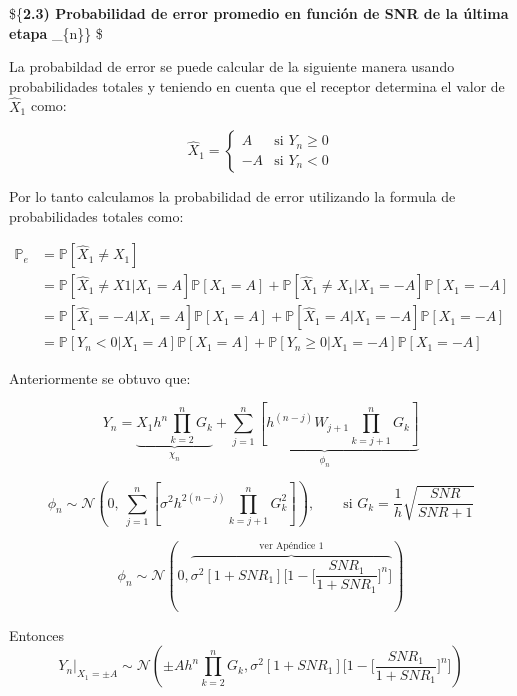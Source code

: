 \documentclass[11pt]{article}
\begin{document}
    \$\{\quad \quad \Large\textbf{2.3) Probabilidad de error promedio en función de SNR de la última etapa }
\rho\_\{n\}\} \$

La probabildad de error se puede calcular de la siguiente manera usando
probabilidades totales y teniendo en cuenta que el receptor determina el
valor de \(\hat{X}_1\) como:

\[
\hat{X}_{1} = \left\{\begin{array}{ll}
         A & \textrm{si } Y_{n} \geq 0\\
        -A & \textrm{si } Y_{n} < 0
      \end{array}\right.
\]

Por lo tanto calculamos la probabilidad de error utilizando la formula
de probabilidades totales como:

\[
\begin{aligned}
\mathbb{P}_{e} &= \mathbb{P}\left[\hat{X}_{1} \neq X_{1}\right]\\ 
&= \mathbb{P}\left[\hat{X}_{1} \neq X{1} |{X_{1} = A}\right]\mathbb{P}\left[X_{1} = A\right] + \mathbb{P}\left[\hat{X}_{1} \neq X_{1} |{X_{1} = -A}\right] \mathbb{P}\left[X_{1} = -A\right]\\
&= \mathbb{P}\left[\hat{X}_{1} = -A |{X_{1} = A}\right] \mathbb{P}\left[X_{1} = A\right] + \mathbb{P}\left[\hat{X}_{1} = A |{X_{1} = -A}\right] \mathbb{P}\left[X_{1} = -A\right]\\
&= \mathbb{P}\left[Y_{n} < 0 |{X_{1} = A}\right] \mathbb{P}\left[X_{1} = A\right] + \mathbb{P}\left[Y_{n} \geq 0 |{X_{1} = -A}\right] \mathbb{P}\left[X_{1} = -A\right]
\end{aligned}
\]

Anteriormente se obtuvo que:

\[ Y_{n} = \underbrace{X_{1} h^{n} \prod_{k=2}^{n} G_{k}}_{\chi_{n}} + \underbrace{\sum_{j=1}^{n} \left[ h^{(n-j)} W_{j+1}  \prod_{k=j+1}^{n} G_{k} \right]}_{\phi_{n}} \]

\[  \phi_{n} \sim \mathcal{N}\left( 0,~ \sum_{j=1}^{n} \left[ \sigma^2 h^{2(n-j)} \prod_{k=j+1}^{n} G_{k}^{2} \right] \right), \quad\quad \text{si }G_k = \frac{1}{h}\sqrt{\frac{SNR}{SNR + 1}} \]

\[\phi_{n} \sim \mathcal{N}(0,\overbrace{ \sigma^2 [1+SNR_1] \Bigg[1-\bigg[\frac{SNR_1}{1+SNR_1}\bigg]^n\Bigg]}^{\text{ver Apéndice 1}}) \]

Entonces
\[{Y_{n}|}_{X_1 = \pm A} \sim \mathcal{N}(\pm A h^{n} \prod_{k=2}^{n} G_{k},\sigma^2 [1+SNR_1] \Bigg[1-\bigg[\frac{SNR_1}{1+SNR_1}\bigg]^n\Bigg])\]
\end{document}
